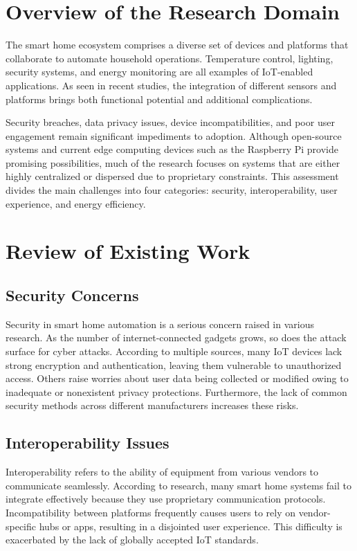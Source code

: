 \documentclass[a4paper,12pt]{report}
\begin{document}
\section{Overview of the Research Domain}
The smart home ecosystem comprises a diverse set of devices and platforms that collaborate to automate household operations.  Temperature control, lighting, security systems, and energy monitoring are all examples of IoT-enabled applications.  As seen in recent studies, the integration of different sensors and platforms brings both functional potential and additional complications\cite{Venkatesh}.

Security breaches, data privacy issues, device incompatibilities, and poor user engagement remain significant impediments to adoption.  Although open-source systems and current edge computing devices such as the Raspberry Pi provide promising possibilities, much of the research focuses on systems that are either highly centralized or dispersed due to proprietary constraints.  This assessment divides the main challenges into four categories: security, interoperability, user experience, and energy efficiency.


\section{Review of Existing Work}
\subsection{Security Concerns}
Security in smart home automation is a serious concern raised in various research.  As the number of internet-connected gadgets grows, so does the attack surface for cyber attacks.  According to multiple sources, many IoT devices lack strong encryption and authentication, leaving them vulnerable to unauthorized access\cite{Venkatesh}\cite{mazid2023iot}.  Others raise worries about user data being collected or modified owing to inadequate or nonexistent privacy protections\cite{li2023let}.  Furthermore, the lack of common security methods across different manufacturers increases these risks\cite{Sobin_2020}\cite{holguin2023smart}.

\subsection{Interoperability Issues}
Interoperability refers to the ability of equipment from various vendors to communicate seamlessly.  According to research, many smart home systems fail to integrate effectively because they use proprietary communication protocols\cite{portales2019challenges}\cite{Sobin_2020}.  Incompatibility between platforms frequently causes users to rely on vendor-specific hubs or apps, resulting in a disjointed user experience.  This difficulty is exacerbated by the lack of globally accepted IoT standards\cite{holguin2023smart}.
\end{document}
